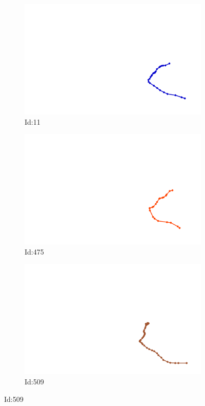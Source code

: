 \documentclass[12pt,twoside]{report}
\begin{document}
\begin{figure}
\centering
\begin{subfigure}[b]{0.20\textwidth}
\centering
\includegraphics[width=\textwidth]{../../trajectories/11.png}
\caption{Id:11}
\end{subfigure}
\begin{subfigure}[b]{0.20\textwidth}
\centering
\includegraphics[width=\textwidth]{../../trajectories/475.png}
\caption{Id:475}
\end{subfigure}
\begin{subfigure}[b]{0.20\textwidth}
\centering
\includegraphics[width=\textwidth]{../../trajectories/509.png}
\caption{Id:509}
\end{subfigure}
\end{figure}
\end{document}
